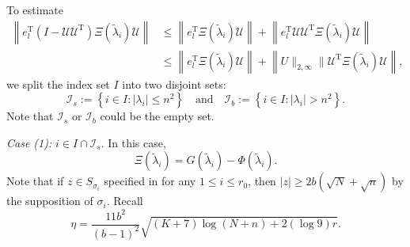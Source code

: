 \documentclass[reqno]{amsart}
\newcommand{\T}{\mathrm{T}}
\theoremstyle{plain}
\theoremstyle{definition}
\begin{document}
To estimate 
\begin{align}\label{eq:con01}
\left\| e_l^\T (I-\mathcal U \mathcal U^\T) \Xi(\widetilde \lambda_i) \mathcal U \right\| &\le \left\|e_l^\T  \Xi(\widetilde \lambda_i) \mathcal U \right\| + \left\| e_l^\T \mathcal U \mathcal U^\T \Xi(\widetilde \lambda_i) \mathcal U \right\|\nonumber\\
& \le \left\|e_l^\T  \Xi(\widetilde \lambda_i) \mathcal U \right\| + \left\| U \|_{2,\infty} \|\mathcal U^\T \Xi(\widetilde \lambda_i) \mathcal U \right\|,
\end{align}
we split the index set $I$ into two disjoint sets: 
$$\mathcal I_s := \left\{ i \in I: | \lambda_i| \le n^2 \right\} \quad\text{and}\quad \mathcal I_b := \left\{ i \in I: | \lambda_i| > n^2 \right\}.$$
Note that $\mathcal I_s$ or  $\mathcal I_b$ could be the empty set.

\medskip

\noindent\emph{Case (1):} $i \in I \cap \mathcal I_s$. In this case,  %
 $$\Xi(\widetilde \lambda_i)=G(\widetilde \lambda_i)-\Phi(\widetilde \lambda_i).$$  Note that if $z\in S_{\sigma_i}$ specified in \cite[Eq. (35)]{Wang24} for any $1\le i \le r_0$, then $|z| \ge 2b(\sqrt N + \sqrt n)$ by the supposition of $\sigma_i$. Recall $$\eta=\frac{11 b^2}{(b-1)^2} \sqrt{(K+7)\log (N+n)+2(\log 9) r}.$$ %
\end{document}
